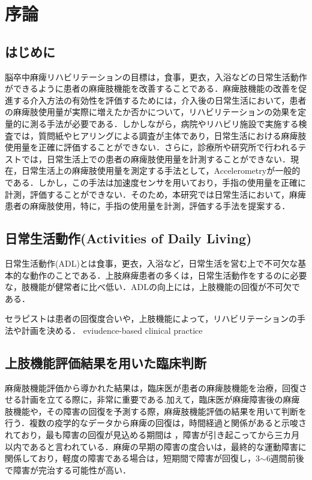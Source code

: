 \chapter{序論}

\section{はじめに}
脳卒中麻痺リハビリテーションの目標は，食事，更衣，入浴などの日常生活動作ができるように患者の麻痺肢機能を改善することである．麻痺肢機能の改善を促進する介入方法の有効性を評価するためには，介入後の日常生活において，患者の麻痺肢使用量が実際に増えたか否かについて，リハビリテーションの効果を定量的に測る手法が必要である．しかしながら，病院やリハビリ施設で実施する検査では，質問紙やヒアリングによる調査が主体であり，日常生活における麻痺肢使用量を正確に評価することができない\cite{Taub2006,Rand2009}．さらに，診療所や研究所で行われるテストでは，日常生活上での患者の麻痺肢使用量を計測することができない．現在，日常生活上の麻痺肢使用量を測定する手法として，Accelerometryが一般的である．しかし，この手法は加速度センサを用いており，手指の使用量を正確に計測，評価することができない．そのため，本研究では日常生活において，麻痺患者の麻痺肢使用，特に，手指の使用量を計測，評価する手法を提案する．

\section{日常生活動作(Activities of Daily Living)}
日常生活動作(ADL)とは食事，更衣，入浴など，日常生活を営む上で不可欠な基本的な動作のことである．上肢麻痺患者の多くは，日常生活動作をするのに必要な，肢機能が健常者に比べ低い\cite{Zeiler2017}．ADLの向上には，上肢機能の回復が不可欠である．

セラピストは患者の回復度合いや，上肢機能によって，リハビリテーションの手法や計画を決める．
eviudence-based clinical practice

\section{上肢機能評価結果を用いた臨床判断}
麻痺肢機能評価から導かれた結果は，臨床医が患者の麻痺肢機能を治療，回復させる計画を立てる際に，非常に重要である\cite{Lang2013}.加えて，臨床医が麻痺障害後の麻痺肢機能や，その障害の回復を予測する際，麻痺肢機能評価の結果を用いて判断を行う．複数の疫学的なデータから麻痺の回復は，時間経過と関係があると示唆されており，最も障害の回復が見込める期間は
，障害が引き起こってから三カ月以内であると言われている．麻痺の早期の障害の度合いは，最終的な運動障害に関係しており，軽度の障害である場合は，短期間で障害が回復し，3$\sim$6週間前後で障害が完治する可能性が高い\cite{Langhorne2011}．



